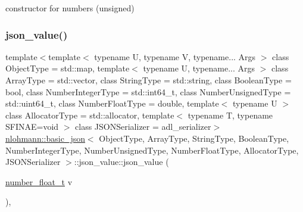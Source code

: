 constructor for numbers (unsigned) 

\mbox{\label{unionnlohmann_1_1basic__json_1_1json__value_a39a41858abe635623710e1b0ce827593}} 
\subsubsection{\texorpdfstring{json\_value()}{json\_value()}\hspace{0.1cm}{\footnotesize\ttfamily [5/12]}}
{\footnotesize\ttfamily template$<$template$<$ typename U, typename V, typename... Args $>$ class Object\+Type = std\+::map, template$<$ typename U, typename... Args $>$ class Array\+Type = std\+::vector, class String\+Type  = std\+::string, class Boolean\+Type  = bool, class Number\+Integer\+Type  = std\+::int64\+\_\+t, class Number\+Unsigned\+Type  = std\+::uint64\+\_\+t, class Number\+Float\+Type  = double, template$<$ typename U $>$ class Allocator\+Type = std\+::allocator, template$<$ typename T, typename S\+F\+I\+N\+A\+E=void $>$ class J\+S\+O\+N\+Serializer = adl\+\_\+serializer$>$ \\
\mbox{\hyperlink{classnlohmann_1_1basic__json}{nlohmann\+::basic\+\_\+json}}$<$ Object\+Type, Array\+Type, String\+Type, Boolean\+Type, Number\+Integer\+Type, Number\+Unsigned\+Type, Number\+Float\+Type, Allocator\+Type, J\+S\+O\+N\+Serializer $>$\+::json\+\_\+value\+::json\+\_\+value (\begin{DoxyParamCaption}\item[{\mbox{\hyperlink{classnlohmann_1_1basic__json_a88d6103cb3620410b35200ee8e313d97}{number\+\_\+float\+\_\+t}}}]{v }\end{DoxyParamCaption})\hspace{0.3cm}{\ttfamily [inline]}, {\ttfamily [noexcept]}}



